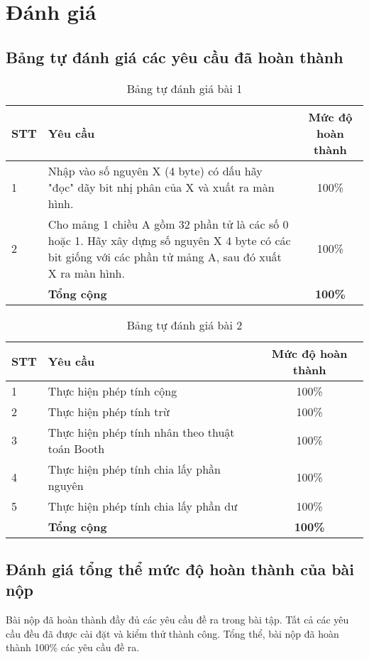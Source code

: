 \section{Đánh giá}
\subsection{Bảng tự đánh giá các yêu cầu đã hoàn thành}

\begin{center}
\begin{table}[H]
    \centering
    \caption{Bảng tự đánh giá bài 1}
    \renewcommand{\arraystretch}{1.4}
    \begin{tabular}{|l|p{}|c|}
    \hline
    \textbf{STT} & \textbf{Yêu cầu}            & \textbf{Mức độ hoàn thành} \\ \hline
    1            &  Nhập vào số nguyên X (4 byte) có dấu hãy "đọc" dãy bit nhị phân của X và xuất ra màn hình.       & 100\%          \\ \hline
    2            & Cho mảng 1 chiều A gồm 32 phần tử là các số 0 hoặc 1. Hãy xây dựng số nguyên X 4 byte có các bit giống với các phần tử mảng A, sau đó xuất X ra màn hình.
    & 100\%          \\ \hline
                & \textbf{Tổng cộng}               &\textbf{100\%}           \\ \hline
    \end{tabular}
    \label{tab:mytable}
\end{table}

  \begin{table}[H]
        \centering
        \caption{Bảng tự đánh giá bài 2}
        \renewcommand{\arraystretch}{1.4}
        \begin{tabular}{|l|p{}|c|}
        \hline
        \textbf{STT} & \textbf{Yêu cầu}            & \textbf{Mức độ hoàn thành} \\ \hline
        1            &  Thực hiện phép tính cộng   & 100\%          \\ \hline
        2            &  Thực hiện phép tính trừ      & 100\%          \\ \hline
        3            &  Thực hiện phép tính nhân theo thuật toán Booth      & 100\%          \\ \hline
        4            &  Thực hiện phép tính chia lấy phần nguyên      & 100\%          \\ \hline
        5            &  Thực hiện phép tính chia lấy phần dư      & 100\%          \\ \hline
                    & \textbf{Tổng cộng}               &\textbf{100\%}           \\ \hline
      \end{tabular}
        \label{tab:mytable2}
  \end{table}
\end{center}

\subsection{Đánh giá tổng thể mức độ hoàn thành của bài nộp}

Bài nộp đã hoàn thành đầy đủ các yêu cầu đề ra trong bài tập. Tất cả các yêu cầu đều đã được cài đặt và kiểm thử thành công. Tổng thể, bài nộp đã hoàn thành 100\% các yêu cầu đề ra.
